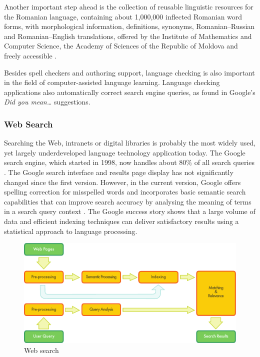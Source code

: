 \begin{multicols}{2}
Another important step ahead is the collection of reusable linguistic resources for the Romanian language, containing about 1,000,000 inflected Romanian word forms, with morphological information, definitions, synonyms, Romanian--Russian and Romanian--English  translations, offered by the Institute of Mathematics and Computer Science, the Academy of Sciences of the Republic of Moldova and freely accessible \cite{elrr}.

Besides spell checkers and authoring support, language checking is also important in the field of computer-assisted language learning. Language checking applications also automatically correct search engine queries, as found in Google's \textit{Did you mean…} suggestions.

\subsubsection{Web Search}

Searching the Web, intranets or digital libraries is probably the most widely used, yet largely underdeveloped language technology application today. The Google search engine, which started in 1998, now handles about 80\% of all search queries \cite{spi1}. The Google search interface and results page display has not significantly changed since the first version. However, in the current version, Google offers spelling correction for misspelled words and incorporates basic semantic search capabilities that can improve search accuracy by analysing the meaning of terms in a search query context \cite{pc1}. The Google success story shows that a large volume of data and efficient indexing techniques can deliver satisfactory results using a statistical approach to language processing. 

\begin{figure}[htb]
  \center
  \includegraphics[width=\textwidth]{../_media/english/web_search_architecture}
  \caption{Web search}
  \label{fig:websearcharch_en}
 \end{figure}


\end{multicols}
